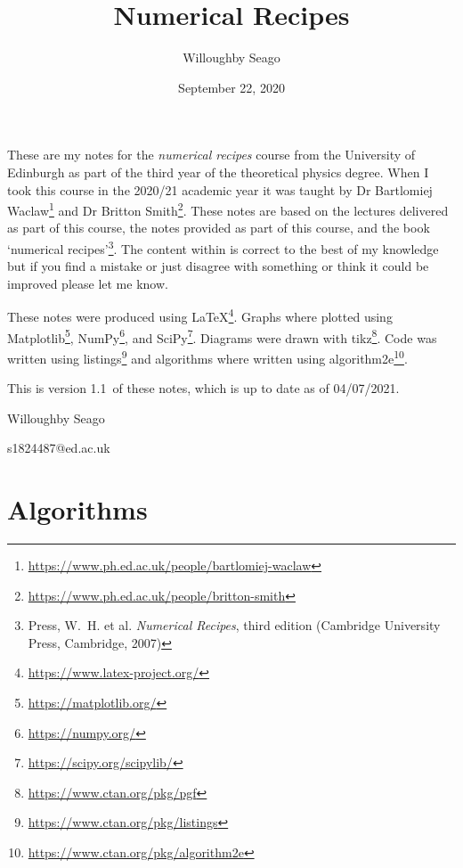 \documentclass[a4paper]{article}
\author{Willoughby Seago}
\date{September 22, 2020}
\title{Numerical Recipes}
\newcommand{\notesVersion}{1.1}
\newcommand{\notesDate}{04/07/2021}
\begin{document}
    \maketitle
    These are my notes for the \textit{numerical recipes} course from the University of Edinburgh as part of the third year of the theoretical physics degree.
    When I took this course in the 2020/21 academic year it was taught by Dr Bartlomiej Waclaw\footnote{\url{https://www.ph.ed.ac.uk/people/bartlomiej-waclaw}} and Dr Britton Smith\footnote{\url{https://www.ph.ed.ac.uk/people/britton-smith}}.
    These notes are based on the lectures delivered as part of this course, the notes provided as part of this course, and the book `numerical recipes'\footnote{Press, W.~H. et al. \textit{Numerical Recipes}, third edition (Cambridge University Press, Cambridge, 2007)}.
    The content within is correct to the best of my knowledge but if you find a mistake or just disagree with something or think it could be improved please let me know.
    
    These notes were produced using \LaTeX\footnote{\url{https://www.latex-project.org/}}.
    Graphs where plotted using Matplotlib\footnote{\url{https://matplotlib.org/}}, NumPy\footnote{\url{https://numpy.org/}}, and SciPy\footnote{\url{https://scipy.org/scipylib/}}.
    Diagrams were drawn with tikz\footnote{\url{https://www.ctan.org/pkg/pgf}}.
    Code was written using listings\footnote{\url{https://www.ctan.org/pkg/listings}} and algorithms where written using algorithm2e\footnote{\url{https://www.ctan.org/pkg/algorithm2e}}.
    
    This is version \notesVersion~of these notes, which is up to date as of \notesDate.
    \begin{flushright}
        Willoughby Seago
        
        s1824487@ed.ac.uk
    \end{flushright}
    \clearpage
    \tableofcontents
    \listoffigures
    \listoftables
    \listofalgorithms
    \printglossary[type=\acronymtype, title=Acronyms, style=long]
    \clearpage
    \begingroup
    \let\clearpage\relax  %
    \endgroup
    \section{Algorithms}
\end{document}
